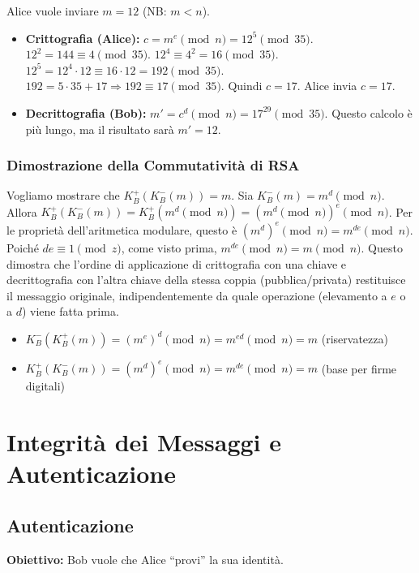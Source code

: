 Alice vuole inviare $m=12$ (NB: $m<n$).
\begin{itemize}
    \item \textbf{Crittografia (Alice):} $c = m^e \pmod n = 12^5 \pmod{35}$.
    $12^2 = 144 \equiv 4 \pmod{35}$.
    $12^4 \equiv 4^2 = 16 \pmod{35}$.
    $12^5 = 12^4 \cdot 12 \equiv 16 \cdot 12 = 192 \pmod{35}$.
    $192 = 5 \cdot 35 + 17 \Rightarrow 192 \equiv 17 \pmod{35}$. Quindi $c=17$.
    Alice invia $c=17$.
    \item \textbf{Decrittografia (Bob):} $m' = c^d \pmod n = 17^{29} \pmod{35}$.
    Questo calcolo è più lungo, ma il risultato sarà $m'=12$.
\end{itemize}

\subsubsection{Dimostrazione della Commutatività di RSA}
\label{ssubsec:comm_rsa_proof}
Vogliamo mostrare che $K_B^+(K_B^-(m)) = m$.
Sia $K_B^-(m) = m^d \pmod n$.
Allora $K_B^+(K_B^-(m)) = K_B^+(m^d \pmod n) = (m^d \pmod n)^e \pmod n$.
Per le proprietà dell'aritmetica modulare, questo è $ (m^d)^e \pmod n = m^{de} \pmod n$.
Poiché $de \equiv 1 \pmod z$, come visto prima, $m^{de} \pmod n = m \pmod n$.
Questo dimostra che l'ordine di applicazione di crittografia con una chiave e decrittografia con l'altra chiave della stessa coppia (pubblica/privata) restituisce il messaggio originale, indipendentemente da quale operazione (elevamento a $e$ o a $d$) viene fatta prima.
\begin{itemize}
    \item $K_B^-(K_B^+(m)) = (m^e)^d \pmod n = m^{ed} \pmod n = m$ (riservatezza)
    \item $K_B^+(K_B^-(m)) = (m^d)^e \pmod n = m^{de} \pmod n = m$ (base per firme digitali)
\end{itemize}

\section{Integrità dei Messaggi e Autenticazione}
\label{sec:integrita_autenticazione}

\subsection{Autenticazione}
\textbf{Obiettivo:} Bob vuole che Alice \textquotedblleft provi\textquotedblright{} la sua identità.

